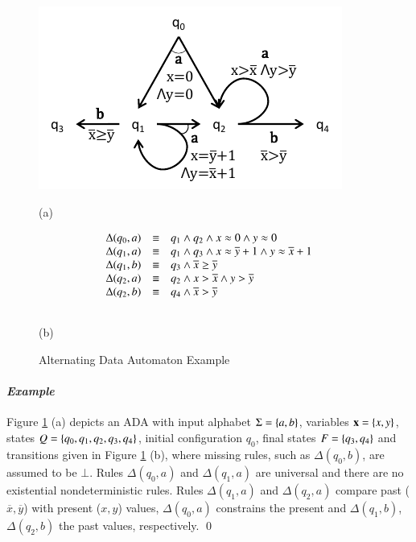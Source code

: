 \documentclass[10pt]{llncs}
\begin{document}
\begin{figure}[htb]
\begin{center}
\begin{minipage}{6cm}
\centerline{\includegraphics[scale=0.8]{Example.pdf}}
\centerline{(a)}
\end{minipage}
\begin{minipage}{6cm}
\[\begin{array}{rcl}
\Delta(q_0,a) & \equiv & q_1 \wedge q_2 \wedge x\approx0 \wedge y\approx0 \\
\Delta(q_1,a) & \equiv & q_1 \wedge q_3 \wedge x\approx\overline{y}+1 \wedge y\approx\overline{x}+1 \\
\Delta(q_1,b) & \equiv & q_3 \wedge \overline{x} \geq \overline{y} \\
\Delta(q_2,a) & \equiv & q_2 \wedge x > \overline{x} \wedge y > \overline{y} \\
\Delta(q_2,b) & \equiv & q_4 \wedge \overline{x}>\overline{y} \\\\
\end{array}\]
\centerline{(b)}
\end{minipage}
\end{center}
\caption{Alternating Data Automaton Example}
\label{fig:ex}
\end{figure}

\paragraph{\em Example}
Figure \ref{fig:ex} (a) depicts an ADA with input alphabet $\Sigma =
\left\{ a,b \right\}$, variables $\mathbf x = \left\{ x,y \right\}$, states $Q =
\left\{ q_0,q_1,q_2,q_3,q_4 \right\}$, initial configuration $q_0$, final states
$F=\left\{ q_3,q_4 \right\}$ and transitions given in Figure \ref{fig:ex} (b),
where missing rules, such as $\Delta(q_0,b)$, are assumed to be
$\bot$. Rules $\Delta(q_0,a)$ and $\Delta(q_1,a)$ are universal and
there are no existential nondeterministic rules. Rules $\Delta(q_1,a)$
and $\Delta(q_2,a)$ compare past ($\overline{x},\overline{y}$) with
present ($x,y$) values, $\Delta(q_0,a)$ constrains the present and
$\Delta(q_1,b)$, $\Delta(q_2,b)$ the past values, respectively. \qed
\end{document}
